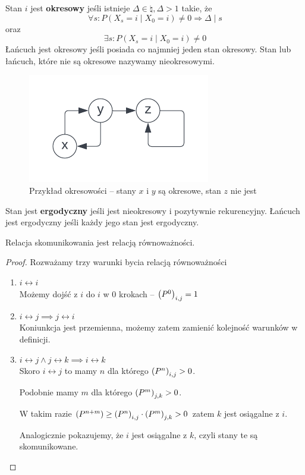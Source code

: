 \begin{definition}
	Stan \(i\) jest \textbf{okresowy} jeśli istnieje \(\Delta \in \natural, \Delta > 1 \) takie, że
	\[
		\forall s : P(X_s = i \mid X_0 = i) \neq 0 \Rightarrow \Delta \mid s
	\]
	oraz
	\[
		\exists s : P(X_s = i \mid X_0 = i) \neq 0
	\]
	Łańcuch jest okresowy jeśli posiada co najmniej jeden stan okresowy.
	Stan lub łańcuch, które nie są okresowe nazywamy nieokresowymi.
\end{definition}
\begin{figure}[H]
	\centering
	\includegraphics{img/markov-chains/periodic-states-example.png}
	\caption{Przykład okresowości -- stany \( x \) i \( y \) są okresowe, stan \( z \) nie jest}
\end{figure}


\begin{definition}
	Stan jest \textbf{ergodyczny} jeśli jest nieokresowy i pozytywnie rekurencyjny.
	Łańcuch jest ergodyczny jeśli każdy jego stan jest ergodyczny.
\end{definition}

\begin{lemma}
	Relacja skomunikowania jest relacją równoważności.
\end{lemma}
\begin{proof} Rozważamy trzy warunki bycia relacją równoważności
	\begin{enumerate}
		\item \( i \leftrightarrow i \) \\
		      Możemy dojść z \( i \) do \( i \) w 0 krokach -- \( \left(P^0\right)_{i, j} = 1 \)

		\item \( i \leftrightarrow j \implies j \leftrightarrow i \) \\
		      Koniunkcja jest przemienna, możemy zatem zamienić kolejność warunków w definicji.

		\item \( i \leftrightarrow j \land j \leftrightarrow k \implies i \leftrightarrow k \) \\
		      Skoro \( i \leftrightarrow j \) to mamy \( n \) dla którego \(\left(P^n\right)_{i, j} > 0\).

		      Podobnie mamy \( m \) dla którego \( \left(P^m\right)_{j, k} > 0 \).

		      W takim razie \( \left(P^{n+m}\right) \geq \left(P^n\right)_{i, j} \cdot \left(P^m\right)_{j, k} > 0 \)
		      zatem \( k \) jest osiągalne z \( i \).

		      Analogicznie pokazujemy, że \( i \) jest osiągalne z \( k \), czyli stany te są skomunikowane.

	\end{enumerate}
\end{proof}

